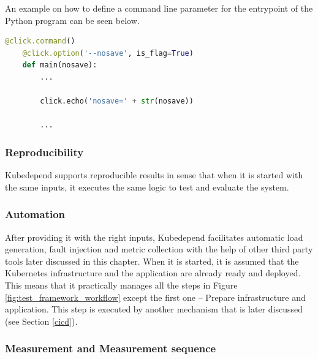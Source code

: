 An example on how to define a command line parameter for the entrypoint of the Python program can be seen below.

\vspace{0.5cm}
\begin{minipage}{\linewidth}
	\begin{lstlisting}[language=python, caption={Define a parameter to control saving test results (simplified extract)}, label={lst:click-option}]
	@click.command()
	@click.option('--nosave', is_flag=True)
	def main(nosave):
		...
	
		click.echo('nosave=' + str(nosave))
		
		...\end{lstlisting}
\end{minipage}

\subsubsection{Reproducibility}

Kubedepend supports reproducible results in sense that when it is started with the same inputs, it executes the same logic to test and evaluate the system. 

\subsubsection{Automation}

After providing it with the right inputs, Kubedepend facilitates automatic load generation, fault injection and metric collection with the help of other third party tools later discussed in this chapter. When it is started, it is assumed that the Kubernetes infrastructure and the application are already ready and deployed. This means that it practically manages all the steps in Figure \ref{fig:test_framework_workflow} except the first one -- Prepare infrastructure and application. This step is executed by another mechanism that is later discussed (see Section \ref{cicd}).

\subsubsection{Measurement and Measurement sequence} \label{test-impl-measurement-seq}

